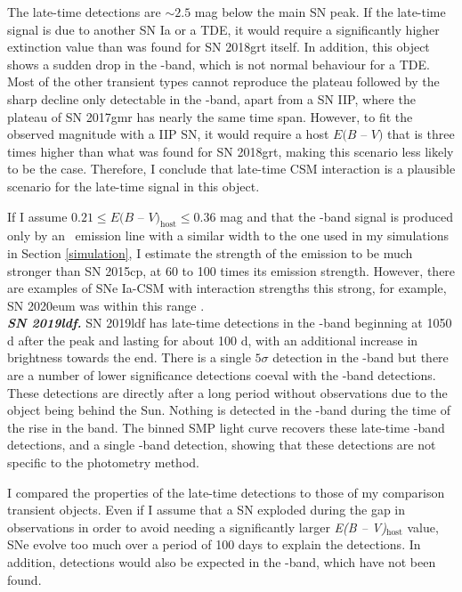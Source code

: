 \documentclass[a4paper,oneside,12pt, class=Latex/Classes/PhDthesisPSnPDF, crop=false]{standalone}
\begin{document}
The late-time detections are $\sim 2.5$ mag below the main SN peak. If the late-time signal is due to another SN Ia or a TDE, it would require a significantly higher extinction value than was found for SN 2018grt itself. In addition, this object shows a sudden drop in the \ztfr-band, which is not normal behaviour for a TDE. Most of the other transient types cannot reproduce the plateau followed by the sharp decline only detectable in the \ztfr-band, apart from a SN IIP, where the plateau of SN 2017gmr has nearly the same time span. However, to fit the observed magnitude with a IIP SN, it would require a host $ E(B$ -- $V)$ that is three times higher than what was found for SN 2018grt, making this scenario less likely to be the case. Therefore, I conclude that late-time CSM interaction is a plausible scenario for the late-time signal in this object.

If I assume $0.21 \leq E(B$ -- $V)_\text{host} \leq 0.36$ mag and that the \ztfr-band signal is produced only by an \Halpha~emission line with a similar width to the one used in my simulations in Section \ref{simulation}, I estimate the strength of the emission to be much stronger than SN 2015cp, at 60 to 100 times its emission strength. However, there are examples of SNe Ia-CSM with interaction strengths this strong, for example, SN 2020eum was within this range \citep{Ia-CSM_BTS}.\\


\textit{\textbf{SN 2019ldf.}}
SN 2019ldf has late-time detections in the \ztfr-band beginning at 1050\,d after the peak and lasting for about 100 d, with an additional increase in brightness towards the end. There is a single $5\sigma$ detection in the \ztfi-band but there are a number of lower significance detections coeval with the \ztfr-band detections. These detections are directly after a long period without observations due to the object being behind the Sun. Nothing is detected in the \ztfg-band during the time of the rise in the \ztfr band. The binned SMP light curve recovers these late-time \ztfr-band detections, and a single \ztfi-band detection, showing that these detections are not specific to the photometry method.

I compared the properties of the late-time detections to those of my comparison transient objects. Even if I assume that a SN exploded during the gap in observations in order to avoid needing a significantly larger \textit{E(B -- V)}$_\text{host}$ value, SNe evolve too much over a period of 100 days to explain the detections. In addition, detections would also be expected in the \ztfg-band, which have not been found. 
\end{document}
